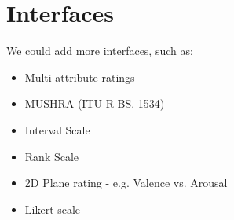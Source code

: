 \documentclass{sig-alternate}
\begin{document}
	
\section{Interfaces}
	We could add more interfaces, such as: 
	\begin{itemize}
		\item Multi attribute ratings
		\item MUSHRA (ITU-R BS. 1534)~\cite{recommendation20031534}
		\item Interval Scale~\cite{zacharov1999round}
		\item Rank Scale~\cite{pascoe1983evaluation}
		
		\item 2D Plane rating - e.g. Valence vs. Arousal~\cite{carroll1969individual}
		\item Likert scale~\cite{likert1932technique}
		

\end{itemize}
\end{document}
